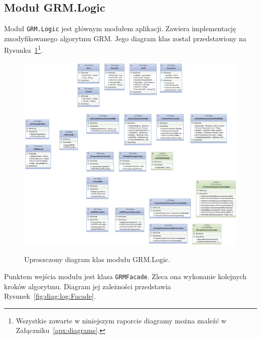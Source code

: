 \documentclass[a4paper,10pt]{article}
\begin{document}
 \subsection{Moduł GRM.Logic}
 Moduł \verb+GRM.Logic+ jest głównym modułem aplikacji.
 Zawiera implementację zmodyfikowanego algorytmu GRM.
 Jego diagram klas został przedstawiony na Rysunku~\ref{fig:diag:log:class}\footnote{Wszystkie zawarte w niniejszym raporcie diagramy można znaleźć w Załączniku~\ref{apx:diagrams}.}.

 \begin{figure}[!ht]
  \begin{center}
   \scalebox{0.42}
   {
    \includegraphics{../diagrams/Logic_class_diagram.png}
   }
  \end{center}
  \caption{
   Uproszczony diagram klas modułu GRM.Logic.
  }
  \label{fig:diag:log:class}
 \end{figure}
  
 Punktem wejścia modułu jest klasa \verb+GRMFacade+.
 Zleca ona wykonanie kolejnych kroków algorytmu.
 Diagram jej zależności przedstawia Rysunek~\ref{fig:diag:log:Facade}.
 
\end{document}
